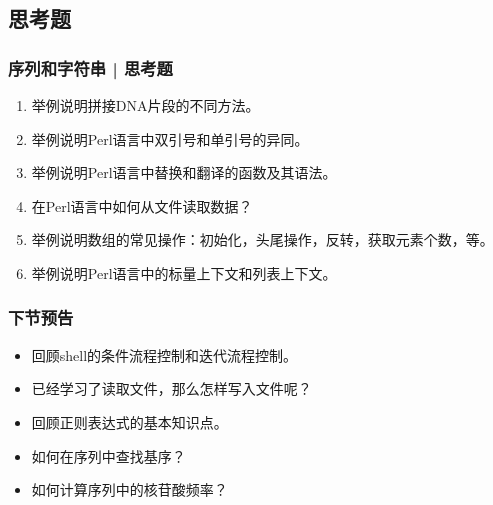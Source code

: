 \subsection{思考题}
\begin{frame}
  \frametitle{序列和字符串 | 思考题}
  \begin{enumerate}
    \item 举例说明拼接DNA片段的不同方法。
    \item 举例说明Perl语言中双引号和单引号的异同。
    \item 举例说明Perl语言中替换和翻译的函数及其语法。
    \item 在Perl语言中如何从文件读取数据？
    \item 举例说明数组的常见操作：初始化，头尾操作，反转，获取元素个数，等。
    \item 举例说明Perl语言中的标量上下文和列表上下文。
  \end{enumerate}
\end{frame}

\begin{frame}
  \frametitle{下节预告}
  \begin{itemize}
    \item 回顾shell的条件流程控制和迭代流程控制。
    \item 已经学习了读取文件，那么怎样写入文件呢？
    \item 回顾正则表达式的基本知识点。
    \item 如何在序列中查找基序？
    \item 如何计算序列中的核苷酸频率？
  \end{itemize}
\end{frame}



